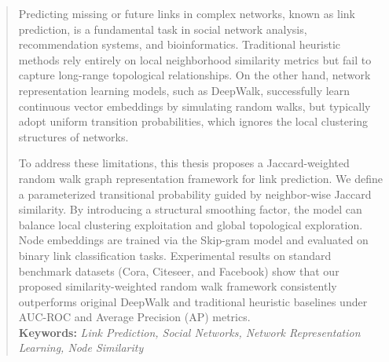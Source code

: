 
\begin{abstract}
Predicting missing or future links in complex networks, known as link prediction, is a fundamental task in social network analysis, recommendation systems, and bioinformatics. Traditional heuristic methods rely entirely on local neighborhood similarity metrics but fail to capture long-range topological relationships. On the other hand, network representation learning models, such as DeepWalk, successfully learn continuous vector embeddings by simulating random walks, but typically adopt uniform transition probabilities, which ignores the local clustering structures of networks.

To address these limitations, this thesis proposes a Jaccard-weighted random walk graph representation framework for link prediction. We define a parameterized transitional probability guided by neighbor-wise Jaccard similarity. By introducing a structural smoothing factor, the model can balance local clustering exploitation and global topological exploration. Node embeddings are trained via the Skip-gram model and evaluated on binary link classification tasks. Experimental results on standard benchmark datasets (Cora, Citeseer, and Facebook) show that our proposed similarity-weighted random walk framework consistently outperforms original DeepWalk and traditional heuristic baselines under AUC-ROC and Average Precision (AP) metrics. \newline
\\
\textbf{Keywords: } \textit{Link Prediction, Social Networks, Network Representation Learning, Node Similarity}
\end{abstract}
